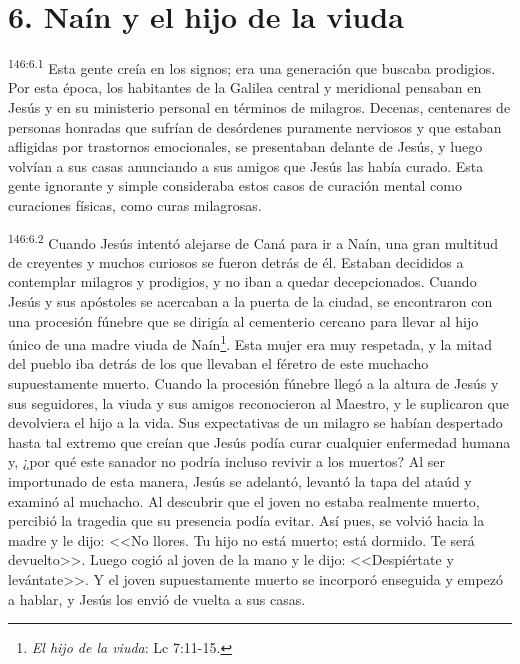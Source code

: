 \section*{6. Naín y el hijo de la viuda}
\par 
\textsuperscript{146:6.1} Esta gente creía en los signos; era una generación que buscaba prodigios. Por esta época, los habitantes de la Galilea central y meridional pensaban en Jesús y en su ministerio personal en términos de milagros. Decenas, centenares de personas honradas que sufrían de desórdenes puramente nerviosos y que estaban afligidas por trastornos emocionales, se presentaban delante de Jesús, y luego volvían a sus casas anunciando a sus amigos que Jesús las había curado. Esta gente ignorante y simple consideraba estos casos de curación mental como curaciones físicas, como curas milagrosas.

\par 
\textsuperscript{146:6.2} Cuando Jesús intentó alejarse de Caná para ir a Naín, una gran multitud de creyentes y muchos curiosos se fueron detrás de él. Estaban decididos a contemplar milagros y prodigios, y no iban a quedar decepcionados. Cuando Jesús y sus apóstoles se acercaban a la puerta de la ciudad, se encontraron con una procesión fúnebre que se dirigía al cementerio cercano para llevar al hijo único de una madre viuda de Naín\footnote{\textit{El hijo de la viuda}: Lc 7:11-15.}. Esta mujer era muy respetada, y la mitad del pueblo iba detrás de los que llevaban el féretro de este muchacho supuestamente muerto. Cuando la procesión fúnebre llegó a la altura de Jesús y sus seguidores, la viuda y sus amigos reconocieron al Maestro, y le suplicaron que devolviera el hijo a la vida. Sus expectativas de un milagro se habían despertado hasta tal extremo que creían que Jesús podía curar cualquier enfermedad humana y, ¿por qué este sanador no podría incluso revivir a los muertos? Al ser importunado de esta manera, Jesús se adelantó, levantó la tapa del ataúd y examinó al muchacho. Al descubrir que el joven no estaba realmente muerto, percibió la tragedia que su presencia podía evitar. Así pues, se volvió hacia la madre y le dijo: <<No llores. Tu hijo no está muerto; está dormido. Te será devuelto>>. Luego cogió al joven de la mano y le dijo: <<Despiértate y levántate>>. Y el joven supuestamente muerto se incorporó enseguida y empezó a hablar, y Jesús los envió de vuelta a sus casas.

